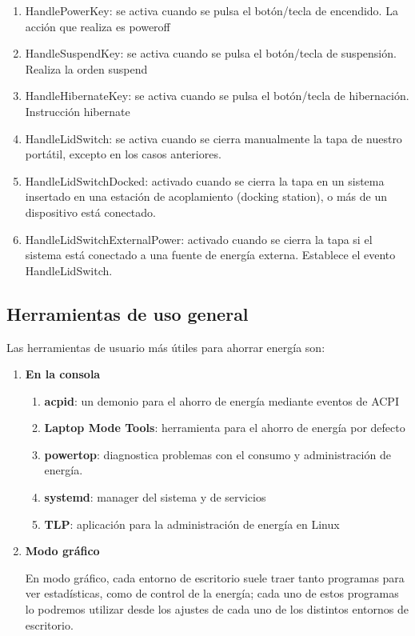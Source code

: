 \documentclass[12pt, spanish]{article}
\begin{document}
\begin{enumerate}
	\item{HandlePowerKey: se activa cuando se pulsa el botón/tecla de encendido. La acción que realiza es poweroff}
	\item{HandleSuspendKey: se activa cuando se pulsa el botón/tecla de suspensión. Realiza la orden suspend}
	\item{HandleHibernateKey: se activa cuando se pulsa el botón/tecla de hibernación. Instrucción hibernate}
	\item{HandleLidSwitch: se activa cuando se cierra manualmente la tapa de nuestro portátil, excepto en los casos anteriores.} 
	\item{HandleLidSwitchDocked: activado cuando se cierra la tapa en un sistema insertado en una estación de acoplamiento (docking station), o más de un dispositivo está conectado.}
	\item{HandleLidSwitchExternalPower: activado cuando se cierra la tapa si el sistema está conectado a una fuente de energía externa. Establece el evento HandleLidSwitch.}

\end{enumerate}

\newpage

\subsection{Herramientas de uso general}

Las herramientas de usuario más útiles para ahorrar energía son:

\begin{enumerate}
\item \textbf{En la consola}

	\begin{enumerate}
	
		\item{\textbf{acpid}: un demonio para el ahorro de energía mediante eventos de ACPI}
    		\item{\textbf{Laptop Mode Tools}: herramienta para el ahorro de energía por defecto}
    		\item{\textbf{powertop}: diagnostica problemas con el consumo y administración de energía.}
    		\item{\textbf{systemd}: manager del sistema y de servicios}
    		\item{\textbf{TLP}: aplicación para la administración de energía en Linux}
	
	\end{enumerate}
	
	
\item \textbf{Modo gráfico}

\quad En modo gráfico, cada entorno de escritorio suele traer tanto programas para ver estadísticas, como de control de la energía; cada uno de estos programas lo podremos utilizar desde los ajustes de cada uno de los distintos entornos de escritorio.


\end{enumerate}

\vspace{5cm}




\end{document}
